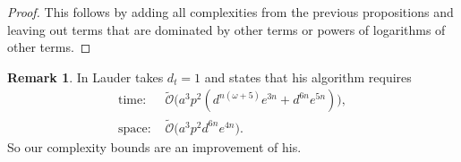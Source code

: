 \documentclass[a4paper,11pt]{article}
\numberwithin{equation}{section}
\providecommand{\SoftOh}{\tilde{\mathcal{O}}} %
\theoremstyle{definition}
\newtheorem{rem}[thm]{Remark}
\begin{document}
\begin{proof}
This follows by adding all complexities from the previous propositions and 
leaving out terms that are dominated by other terms or powers of
logarithms of other terms.
\end{proof}

\begin{rem} In \cite{Lauder2004a} Lauder takes $d_t=1$ and states that his
algorithm requires
\begin{align*}
\mbox{time: }  &\SoftOh\bigl(a^3 p^2 (d^{n(\omega+5)} e^{3n} + d^{6n} e^{5n}) \bigr), \\ 
\mbox{space: } &\SoftOh\bigl(a^3 p^2 d^{6n} e^{4n} \bigr).
\end{align*}
So our complexity bounds are an improvement of his.
\end{rem}

\begin{comment}
\begin{rem}
When $\mathfrak{q}=q$ and $d_t=1$, the bounds for the time and space 
complexity simplify to
\begin{align*}
\mbox{time: }  &\SoftOh\Bigl( a^2 \log(p) d_t \bigl(d^{n(\omega+2)} e^{n(\omega+1)} + d^{5n} e^{n}\bigr) + a^3 p d^{n(\omega+3)} e^n d_t \Bigr), \\
\mbox{space: } &\SoftOh\bigl( a^2 \log(p) d^{4n} e^{3n} d_t + a^3 p d^{4n} \bigr).
\end{align*}
\end{rem}
\end{comment}
\end{document}
